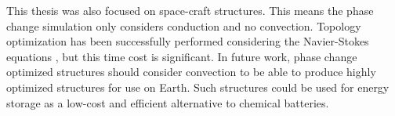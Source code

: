 This thesis was also focused on space-craft structures. This means the phase change simulation only considers conduction and no convection. Topology optimization has been successfully performed considering the Navier-Stokes equations \cite{Alexandersen_Sigmund_Aage_2016}, but this time cost is significant. In future work, phase change optimized structures should consider convection to be able to produce highly optimized structures for use on Earth. Such structures could be used for energy storage as a low-cost and efficient alternative to chemical batteries.